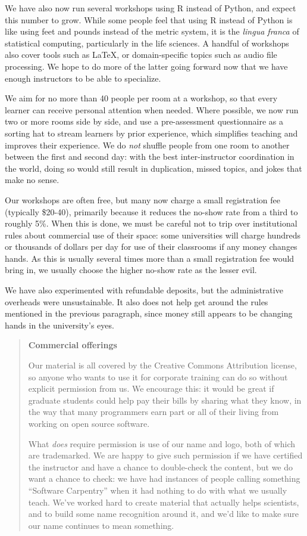\documentclass[10pt,a4paper,twocolumn]{article}
\begin{document}
We have also now run several workshops using R instead of Python, and
expect this number to grow. While some people feel that using R instead
of Python is like using feet and pounds instead of the metric system, it
is the \emph{lingua franca} of statistical computing, particularly in
the life sciences. A handful of workshops also cover tools such as
LaTeX, or domain-specific topics such as audio file processing. We hope
to do more of the latter going forward now that we have enough
instructors to be able to specialize.

We aim for no more than 40 people per room at a workshop, so that
every learner can receive personal attention when needed.  Where
possible, we now run two or more rooms side by side, and use a
pre-assessment questionnaire as a sorting hat to stream learners by
prior experience, which simplifies teaching and improves their
experience.  We do \emph{not} shuffle people from one room to another
between the first and second day: with the best inter-instructor
coordination in the world, doing so would still result in duplication,
missed topics, and jokes that make no sense.

Our workshops are often free, but many now charge a small registration
fee (typically \$20-40), primarily because it reduces the no-show rate
from a third to roughly 5\%.  When this is done, we must be careful
not to trip over institutional rules about commercial use of their
space: some universities will charge hundreds or thousands of dollars
per day for use of their classrooms if any money changes hands.  As
this is usually several times more than a small registration fee would
bring in, we usually choose the higher no-show rate as the lesser
evil.

We have also experimented with refundable deposits, but the
administrative overheads were unsustainable.  It also does not help
get around the rules mentioned in the previous paragraph, since money
still appears to be changing hands in the university's eyes.

\begin{quote}
\textbf{Commercial offerings}

Our material \cite{swcsite,swcgithub} is all covered by the Creative
Commons Attribution license, so anyone who wants to use it for
corporate training can do so without explicit permission from us. We
encourage this: it would be great if graduate students could help pay
their bills by sharing what they know, in the way that many
programmers earn part or all of their living from working on open
source software.

What \emph{does} require permission is use of our name and logo, both
of which are trademarked. We are happy to give such permission if we
have certified the instructor and have a chance to double-check the
content, but we do want a chance to check: we have had instances of
people calling something ``Software Carpentry'' when it had nothing to
do with what we usually teach. We've worked hard to create material
that actually helps scientists, and to build some name recognition
around it, and we'd like to make sure our name continues to mean
something.
\end{quote}
\end{document}
